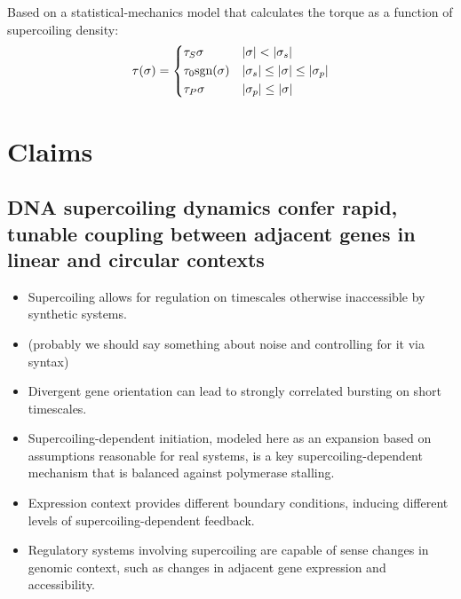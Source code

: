\documentclass[11pt]{article}
\begin{document}
Based on a statistical-mechanics model that calculates the torque as a function of supercoiling density:
\begin{equation}
    \tau(\sigma) = \begin{dcases} \tau_S \sigma & |\sigma| < |\sigma_s| \\ \tau_0 \text{sgn}(\sigma) & |\sigma_s| \leq |\sigma | \leq |\sigma_p| \\ \tau_P \sigma & |\sigma_p| \leq |\sigma|\end{dcases}
\end{equation}



\section{Claims}

\subsection{ DNA supercoiling dynamics confer rapid, tunable coupling between adjacent genes in linear and circular contexts }
\begin{itemize}
    \item Supercoiling allows for regulation on timescales otherwise inaccessible by synthetic systems.

    \item (probably we should say something about noise and controlling for it via syntax)

    \item Divergent gene orientation can lead to strongly correlated bursting on short timescales.

    \item Supercoiling-dependent initiation, modeled here as an expansion based on assumptions reasonable for real systems, is a key supercoiling-dependent mechanism that is balanced against polymerase stalling.

    \item Expression context provides different boundary conditions, inducing different levels of supercoiling-dependent feedback.

    \item Regulatory systems involving supercoiling are capable of sense changes in genomic context, such as changes in adjacent gene expression and accessibility.
\end{itemize}


\clearpage
\end{document}
